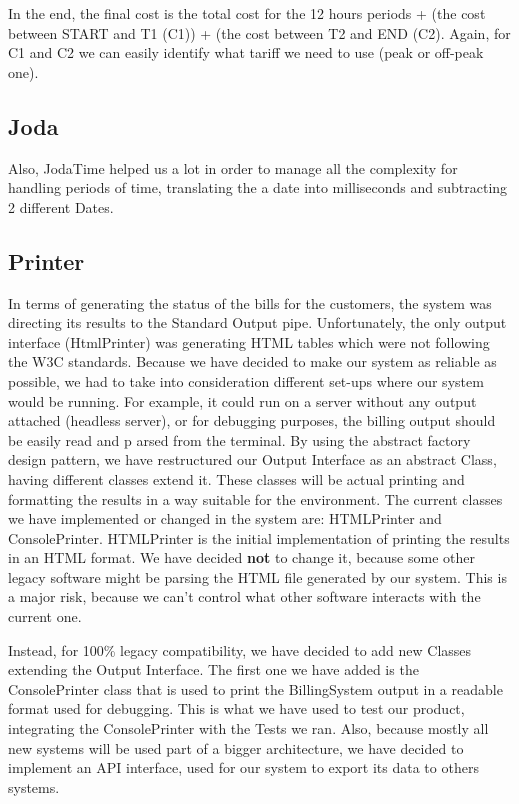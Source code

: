 \documentclass[11pt,twocolumn]{article} %
\begin{document}
In the end, the final cost is the total cost for the 12 hours periods + (the cost between START and T1 (C1)) + (the cost between T2 and END (C2). 
Again, for C1 and C2 we can easily identify what tariff we need to use (peak or off-peak one).

\subsection{Joda}
Also, JodaTime helped us a lot in order to manage all the complexity for handling periods of time,
translating the a date into milliseconds and subtracting 2 different Dates. 

\subsection{Printer}
In terms of generating the status of the bills for the customers, the system was directing its results to the Standard Output pipe. 
Unfortunately, the only output interface (HtmlPrinter) was generating HTML tables which were not following the W3C standards. 
Because we have decided to make our system as reliable as possible, we had to take into consideration different set-ups where our system would be running. 
For example, it could run on a server without any output attached (headless server), or for debugging purposes, 
the billing output should be easily read and p arsed from the terminal. 
By using the abstract factory design pattern, we have restructured our Output Interface as an abstract Class, 
having different classes extend it. These classes will be actual printing and formatting the results in a way suitable for the environment.
The current classes we have implemented or changed in the system are: HTMLPrinter and ConsolePrinter. HTMLPrinter is the initial implementation 
of printing the results in an HTML format. We have decided \textbf{not} to change it, because some other legacy software might be parsing the
HTML file generated by our system. This is a major risk, because we can't control what other software interacts with the current one.

Instead, for 100\% legacy compatibility, we have decided to add new Classes extending the Output Interface. 
The first one we have added is the ConsolePrinter class that is used to print the BillingSystem output in a readable format used for debugging.
This is what we have used to test our product, integrating the ConsolePrinter with the Tests we ran. Also, because mostly all new systems will be used 
part of a bigger architecture, we have decided to implement an API interface, used for our system to export its data to others systems. 
\end{document}
